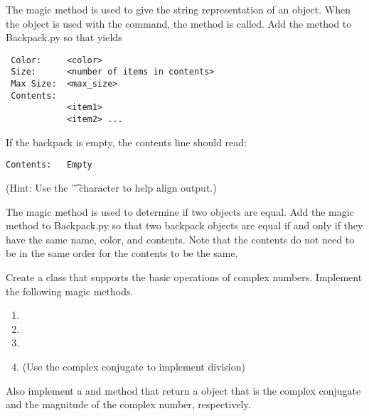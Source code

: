 \begin{problem}

The  magic method is used to give the string representation of an object.
When the object is used with the  command, the  method is called.
Add the  method to Backpack.py so that  yields
\begin{lstlisting}
 Color:		<color>
 Size:		<number of items in contents>
 Max Size:	<max_size>
 Contents:
 			<item1>
 			<item2> ...
\end{lstlisting}

If the backpack is empty, the contents line should read:
\begin{lstlisting}
Contents:	Empty
\end{lstlisting}
(Hint: Use the '\t' character to help align output.)

The  magic method is used to determine if two objects are equal.
Add the  magic method to Backpack.py so that two backpack objects are equal if and only if they have the same name, color, and contents.
Note that the contents do not need to be in the same order for the contents to be the same.
\end{problem}

\begin{problem}
Create a  class that supports the basic operations of complex numbers.
Implement the following magic methods.
\begin{enumerate}
\item {}
\item {}
\item {}
\item {} (Use the complex conjugate to implement division)
\end{enumerate}

Also implement a  and  method that return a  object that is the complex conjugate and the magnitude of the complex number, respectively.
\end{problem}
